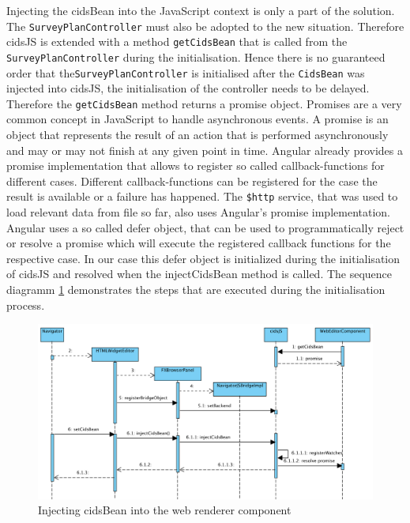 Injecting the cidsBean into the JavaScript context is only a part of the solution.
The \texttt{SurveyPlanController} must also be adopted to the new situation.
Therefore cidsJS is extended with a method \texttt{getCidsBean} that is called from the \texttt{SurveyPlanController} during the initialisation.
Hence there is no guaranteed order that the\texttt{SurveyPlanController} is initialised after the \texttt{CidsBean} was injected into cidsJS, the initialisation of the controller needs to be delayed.
Therefore the \texttt{getCidsBean} method returns a promise object.
Promises are a very common concept in JavaScript to handle asynchronous events.
A promise is an object that represents the result of an action that is performed asynchronously and may or may not finish at any given point in time.
Angular already provides a promise implementation that allows to register so called callback-functions for different cases.
Different callback-functions can be registered for the case the result is available or a failure has happened.
The \texttt{\$http} service, that was used to load relevant data from file so far, also uses Angular’s promise implementation.
Angular uses a so called defer object, that can be used to programmatically reject or resolve a promise which will execute the registered callback functions for the respective case.
In our case this defer object is initialized during the initialisation of cidsJS and resolved when the injectCidsBean method is called. The sequence diagramm \ref{fig:seq-diag-data-exchange-1} demonstrates the steps that are executed during the initialisation process.

\begin{figure}
	\centering	\includegraphics[width=1.0\textwidth]{./img/classDiagramms/seq_diag_data_exchange.png}
	\caption{Injecting cidsBean into the web renderer component}
	\label{fig:seq-diag-data-exchange-1}
\end{figure}

